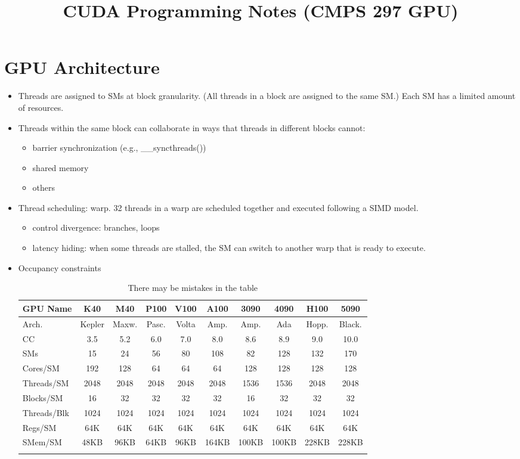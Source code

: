 \documentclass{article}
\title{CUDA Programming Notes (CMPS 297 GPU)}
\author{}
\date{}
\begin{document}
\maketitle
\tableofcontents
\section{GPU Architecture}

\begin{itemize}
\item Threads are assigned to SMs at block granularity. (All threads in a block are assigned to the same SM.) Each SM has a limited amount of resources.
\item Threads within the same block can collaborate in ways that threads in different blocks cannot:
\begin{itemize}
\item barrier synchronization (e.g., \_\_syncthreads())
\item shared memory
\item others
\end{itemize}
\item Thread scheduling: warp. 32 threads in a warp are scheduled together and executed following a SIMD model.
\begin{itemize}
\item control divergence: branches, loops
\item latency hiding: when some threads are stalled, the SM can switch to another warp that is ready to execute.
\end{itemize}
\item Occupancy constraints

\setlength{\tabcolsep}{3pt}
\begin{longtable}{lccccccccc}
\hline
\textbf{GPU Name} & \textbf{K40} & \textbf{M40} & \textbf{P100} & \textbf{V100} & \textbf{A100} & \textbf{3090} & \textbf{4090} & \textbf{H100} & \textbf{5090} \\ \hline
Arch. & Kepler & Maxw. & Pasc. & Volta & Amp. & Amp. & Ada & Hopp. & Black. \\ \hline
CC & 3.5 & 5.2 & 6.0 & 7.0 & 8.0 & 8.6 & 8.9 & 9.0 & 10.0 \\ \hline
SMs & 15 & 24 & 56 & 80 & 108 & 82 & 128 & 132 & 170 \\ \hline
Cores/SM & 192 & 128 & 64 & 64 & 64 & 128 & 128 & 128 & 128 \\ \hline
Threads/SM & 2048 & 2048 & 2048 & 2048 & 2048 & 1536 & 1536 & 2048 & 2048 \\ \hline
Blocks/SM & 16 & 32 & 32 & 32 & 32 & 16 & 32 & 32 & 32 \\ \hline
Threads/Blk & 1024 & 1024 & 1024 & 1024 & 1024 & 1024 & 1024 & 1024 & 1024 \\ \hline
Regs/SM & 64K & 64K & 64K & 64K & 64K & 64K & 64K & 64K & 64K \\ \hline
SMem/SM & 48KB & 96KB & 64KB & 96KB & 164KB & 100KB & 100KB & 228KB & 228KB \\ \hline
\caption{There may be mistakes in the table}
\end{longtable}

\end{itemize}
\end{document}
